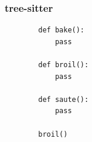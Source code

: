 \documentclass[aspectratio=169]{beamer}
\begin{document}
\begin{frame}[fragile]
    \frametitle{tree-sitter}
    \begin{center}
    \begin{minipage}{0.75\textwidth}
    \begin{minipage}{9em}
    \begin{verbatim}
        def bake():
            pass

        def broil():
            pass

        def saute():
            pass

        broil()
    \end{verbatim}
    \end{minipage}
    \end{minipage}
    \end{center}
\end{frame}
\end{document}
